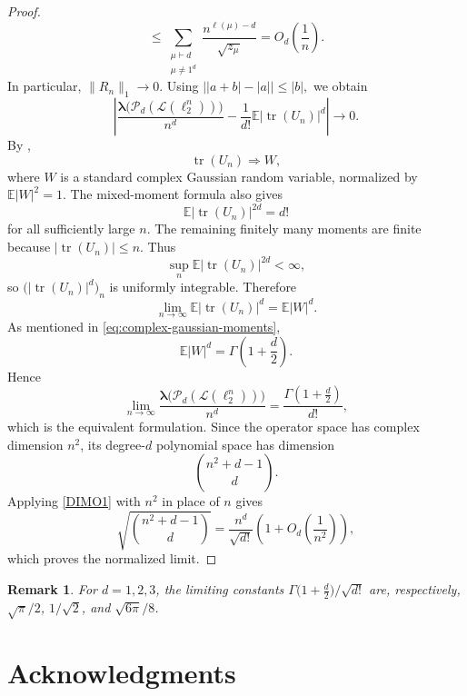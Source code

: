 \documentclass[11pt,showkeys]{amsart}
\newtheorem{remark}[theorem]{Remark}
\begin{document}
\begin{proof}
\[        \leq
        \sum_{\substack{\mu\vdash d\\\mu\ne1^d}}
        \frac{n^{\ell(\mu)-d}}{\sqrt{z_\mu}}
        =
        O_d\left(\frac1n\right).
\]
In particular, \(\|R_n\|_1\to0\). Using
\(
        \bigl||a+b|-|a|\bigr|\leq |b|,
\)
we obtain
\[
        \left|
        \frac{
        \boldsymbol\lambda\bigl(\mathcal P_d(\mathcal L(\ell_2^n))\bigr)}
        {n^d}
        -
        \frac1{d!}
        \mathbb E
        \left|
        \operatorname{tr}(U_n)
        \right|^d
        \right|
        \longrightarrow0.
\]
By \cite[Theorem~1]{diaconis1994eigenvalues},
\[
        \operatorname{tr}(U_n)\Longrightarrow W,
\]
where \(W\) is a standard complex Gaussian random variable, normalized
by \(\mathbb E|W|^2=1\). The mixed-moment formula also gives
\[
        \mathbb E|\operatorname{tr}(U_n)|^{2d}=d!
\]
for all sufficiently large \(n\). The remaining finitely many moments
are finite because \(|\operatorname{tr}(U_n)|\leq n\). Thus
\[
        \sup_n\mathbb E|\operatorname{tr}(U_n)|^{2d}<\infty,
\]
so \(\bigl(|\operatorname{tr}(U_n)|^d\bigr)_n\) is uniformly
integrable. Therefore
\[
        \lim_{n\to\infty}
        \mathbb E
        \left|
        \operatorname{tr}(U_n)
        \right|^d
        =
        \mathbb E|W|^d.
\]
As mentioned in \eqref{eq:complex-gaussian-moments},
\[
        \mathbb E|W|^d
        =
        \Gamma\left(1+\frac d2\right).
\]
Hence
\[
        \lim_{n\to\infty}
        \frac{
        \boldsymbol\lambda\bigl(\mathcal P_d(\mathcal L(\ell_2^n))\bigr)}
        {n^d}
        =
        \frac{\Gamma\left(1+\frac d2\right)}{d!},
\]
which is the equivalent formulation. Since the operator space has
complex dimension \(n^2\), its degree-\(d\) polynomial space has
dimension
\[
        \binom{n^2+d-1}{d}.
\]
Applying \eqref{DIMO1} with \(n^2\) in place of \(n\) gives
\[
        \sqrt{\binom{n^2+d-1}{d}}
        =
        \frac{n^d}{\sqrt{d!}}
        \left(1+O_d\left(\frac1{n^2}\right)\right),
\]
which proves the normalized limit.
\end{proof}

\begin{remark} For \(d=1,2,3\), the limiting constants $\Gamma\big(1+\frac d2\big)/\sqrt{d!}$ are, respectively, \(\sqrt{\pi}/2\), \(1/\sqrt{2}\), and \(\sqrt{6\pi}/8\). \end{remark}


\section*{Acknowledgments}
\end{document}
